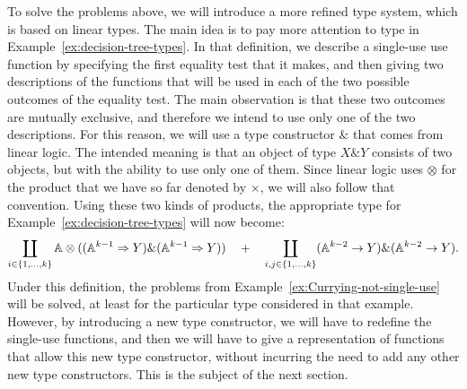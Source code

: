 To solve the problems above, we will introduce a more refined type system, which is based on linear types.  The main idea is to pay more attention to type  in Example~\ref{ex:decision-tree-types}. In that definition, we describe a single-use use function by specifying the first equality test that it makes, and then giving two descriptions of the functions that will be used in each of the two possible outcomes of the equality test. The main observation is that these two outcomes are mutually exclusive, and therefore we intend to use only one of the two descriptions. For this reason, we will use a  type constructor $\&$ that comes from linear logic. The intended meaning is  that an object of type $X \& Y$ consists of two objects, but with the ability to use only one of them. Since linear logic uses $\otimes$  for the  product that we have so far denoted by $\times$, we will also follow that convention. Using these two kinds of products, the appropriate type for Example~\ref{ex:decision-tree-types} will now become: 
\begin{align*}
\coprod_{i \in \{1,\ldots,k\}} 
        \mathbb A \otimes ((\mathbb A^{k-1} \Rightarrow Y) \& (\mathbb A^{k-1} \Rightarrow Y))
          \quad + \quad 
    \coprod_{i, j \in \{1,\ldots,k\}} (\mathbb A^{k-2} \to Y) \& (\mathbb A^{k-2} \to Y).
    \end{align*}
Under this definition, the problems from Example~\ref{ex:Currying-not-single-use} will be solved, at least for the particular type considered in that example. However, by introducing a new type constructor, we will have to redefine the single-use functions, and then we will have to give a representation of functions that allow this new type constructor, without incurring the need to add any other new type constructors. This is the subject of the next section.

